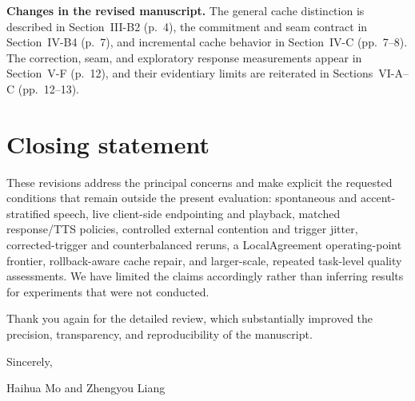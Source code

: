 \documentclass[11pt]{article}
\newcommand{\changes}{\vspace{0.25em}\noindent\textbf{Changes in the revised manuscript.} }
\begin{document}
\changes The general cache distinction is described in Section~III-B2 (p.~4), the commitment and seam contract in Section~IV-B4 (p.~7), and incremental cache behavior in Section~IV-C (pp.~7--8). The correction, seam, and exploratory response measurements appear in Section~V-F (p.~12), and their evidentiary limits are reiterated in Sections~VI-A--C (pp.~12--13).

\section*{Closing statement}

These revisions address the principal concerns and make explicit the requested conditions that remain outside the present evaluation: spontaneous and accent-stratified speech, live client-side endpointing and playback, matched response/TTS policies, controlled external contention and trigger jitter, corrected-trigger and counterbalanced reruns, a LocalAgreement operating-point frontier, rollback-aware cache repair, and larger-scale, repeated task-level quality assessments. We have limited the claims accordingly rather than inferring results for experiments that were not conducted.

Thank you again for the detailed review, which substantially improved the precision, transparency, and reproducibility of the manuscript.

Sincerely,

Haihua Mo and Zhengyou Liang
\end{document}
